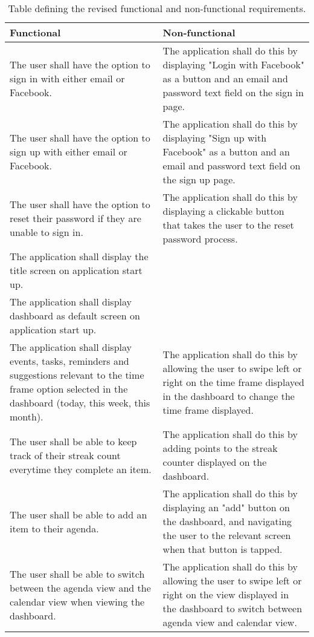 \begin{table}[H]
    \centering
    \caption{Table defining the revised functional and non-functional requirements.}
    \begin{tabular}{|p{7cm}|p{7cm}|}
        \hline
        Functional& Non-functional\\
        \hline
        The user shall have the option to sign in with either email or Facebook.& The application shall do this by displaying "Login with Facebook" as a button and an email and password text field on the sign in page.\\
        \hline
        The user shall have the option to sign up with either email or Facebook.& The application shall do this by displaying "Sign up with Facebook" as a button and an email and password text field on the sign up page.\\
        \hline
        The user shall have the option to reset their password if they are unable to sign in.& The application shall do this by displaying a clickable button that takes the user to the reset password process.\\
        \hline
        The application shall display the title screen on application start up.&\\
        \hline
        The application shall display dashboard as default screen on application start up.&\\
        \hline
        The application shall display events, tasks, reminders and suggestions relevant to the time frame option selected in the dashboard (today, this week, this month).& The application shall do this by allowing the user to swipe left or right on the time frame displayed in the dashboard to change the time frame displayed.\\
        \hline
        The user shall be able to keep track of their streak count everytime they complete an item.& The application shall do this by adding points to the streak counter displayed on the dashboard.\\
        \hline
        The user shall be able to add an item to their agenda.& The application shall do this by displaying an "add" button on the dashboard, and navigating the user to the relevant screen when that button is tapped.\\
        \hline
        The user shall be able to switch between the agenda view and the calendar view when viewing the dashboard.& The application shall do this by allowing the user to swipe left or right on the view displayed in the dashboard to switch between agenda view and calendar view.\\
        \hline
    \end{tabular}
\end{table}
    
